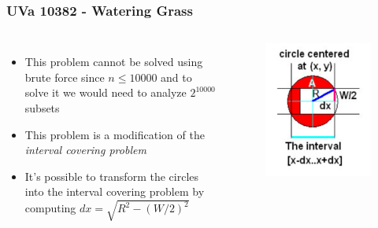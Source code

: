 \documentclass{beamer}
\begin{document}
\begin{frame}[fragile]
\frametitle{UVa 10382 - Watering Grass}

\begin{columns}
	\begin{itemize}
	    \item This problem cannot be solved using brute force since $n \leq 10000$ and to solve it we would need to analyze $2^{10000}$ subsets
    	\item This problem is a modification of the \textit{interval covering problem}
	    \item It's possible to transform the circles into the interval covering problem by computing $dx = \sqrt{R^2 - (W/2)^2}$
	\end{itemize}
	
	\begin{figure}
	    \centering
	    \includegraphics[scale=0.4]{imgs/uva_10382_2.png}
	\end{figure}

\end{columns}
\end{frame}
\end{document}
